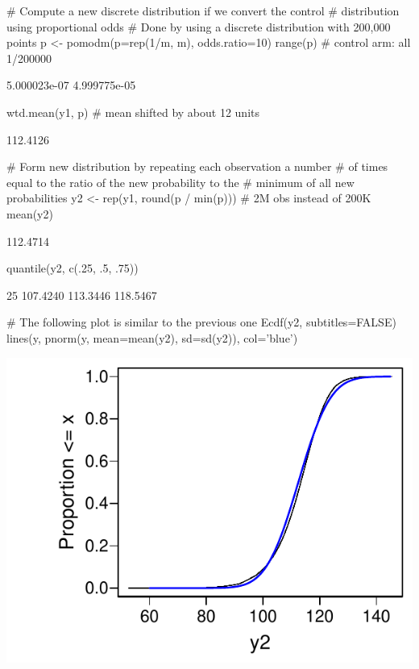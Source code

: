 \begin{Schunk}
\begin{Sinput}
# Compute a new discrete distribution if we convert the control
# distribution using proportional odds
# Done by using a discrete distribution with 200,000 points
p <- pomodm(p=rep(1/m, m), odds.ratio=10)
range(p)  # control arm: all 1/200000
\end{Sinput}
\begin{Soutput}
[1] 5.000023e-07 4.999775e-05
\end{Soutput}
\begin{Sinput}
wtd.mean(y1, p)  # mean shifted by about 12 units
\end{Sinput}
\begin{Soutput}
[1] 112.4126
\end{Soutput}
\begin{Sinput}
# Form new distribution by repeating each observation a number
# of times equal to the ratio of the new probability to the
# minimum of all new probabilities
y2 <- rep(y1, round(p / min(p)))  # 2M obs instead of 200K
mean(y2)
\end{Sinput}
\begin{Soutput}
[1] 112.4714
\end{Soutput}
\begin{Sinput}
quantile(y2, c(.25, .5, .75))
\end{Sinput}
\begin{Soutput}
     25%
107.4240 113.3446 118.5467 
\end{Soutput}
\begin{Sinput}
# The following plot is similar to the previous one
Ecdf(y2, subtitles=FALSE)
lines(y, pnorm(y, mean=mean(y2), sd=sd(y2)), col='blue')
\end{Sinput}


\centerline{\includegraphics[width=\maxwidth]{nonpar-hownn3-1} }

\end{Schunk}


